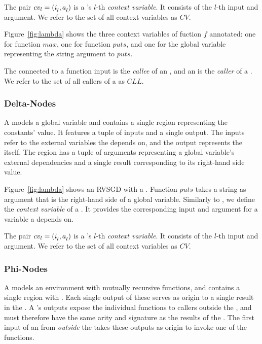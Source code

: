 \begin{definition}
The pair $cv_{l} = (\mbox{$i_{l}^{}$}, \mbox{$a_{l}^{}$})$ is a \lambdanode's $l$-th \emph{context variable}.
It consists of the $l$-th input and argument. We refer to the set of all context
variables as $CV$.
\end{definition}

Figure~\ref{fig:lambda} shows the three context variables of fuction $f$ annotated: one for
function $max$, one for function $puts$, and one for the global variable representing the string
argument to $puts$.

\begin{definition}
The \lambdanode connected to a function input is the \emph{callee} of an \applynode, and an
\applynode is the \emph{caller} of a \lambdanode. We refer to the set of all callers of a
\lambdanode as $CLL$.
\end{definition}

\subsubsection{Delta-Nodes}
A \deltanode models a global variable and contains a single region representing the constants'
value. It features a tuple of inputs and a single output. The inputs refer to the external
variables the \deltanode depends on, and the output represents the \deltanode itself. The region
has a tuple of arguments representing a global variable's external dependencies and a single
result corresponding to its right-hand side value.

Figure~\ref{fig:lambda} shows an RVSGD with a \deltanode. Function $puts$ takes a string as
argument that is the right-hand side of a global variable.
Similarly to \lambdanodes, we define the \emph{context variable} of a \deltanode. It provides the
corresponding input and argument for a variable a \deltanode depends on.

\begin{definition}
The pair $cv_{l} = (\mbox{$i_{l}^{}$}, \mbox{$a_{l}^{}$})$ is a \deltanode's $l$-th \emph{context variable}.
It consists of the $l$-th input and argument. We refer to the set of all context variables as $CV$.
\end{definition}

\subsubsection{Phi-Nodes}
A \phinode models an environment with mutually recursive functions, and contains
a single region with \lambdanodes. Each single output of these \lambdanodes serves as origin to a
single result in the \phiregion. A \phinode's outputs expose the individual functions to callers
outside the \phiregion, and must therefore have the same arity and signature as the results of the
\phiregion. The first input of an \applynode from \emph{outside} the \phiregion takes these
outputs as origin to invoke one of the functions.

